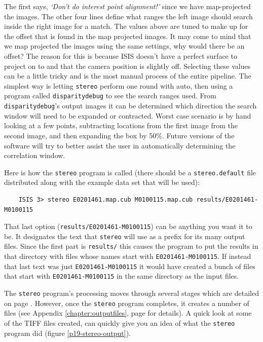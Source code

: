 The first says, \emph{`Don't do interest point alignment!'} since
we have map-projected the images. The other four lines define what
ranges the left image should search inside the right image for a
match. The values above are tuned to make up for the offset that
is found in the map projected images. It may come to mind that we
map projected the images using the same settings, why would there
be an offset? The reason for this is because \ac{ISIS} doesn't have
a perfect surface to project on to and that the camera position is
slightly off. Selecting these values can be a little tricky and is
the most manual process of the entire pipeline. The simplest way
is letting \texttt{stereo} perform one round with auto, then using
a program called \texttt{disparitydebug} to see the search ranges
used. From \texttt{disparitydebug}'s output images it can be
determined which direction the search window will need to be expanded
or contracted. Worst case scenario is by hand looking at a few
points, subtracting locations from the first image from the second
image, and then expanding the box by 50\%. Future versions of the
software will try to better assist the user in automatically
determining the correlation window.

\pagebreak

Here is how the \texttt{stereo} program is called (there should be a
\texttt{stereo.default} file distributed along with the example data
set that will be used):

\begin{verbatim}
    ISIS 3> stereo E0201461.map.cub M0100115.map.cub results/E0201461-M0100115
\end{verbatim}

\noindent
That last option (\texttt{results/E0201461-M0100115}) can be anything you
want it to be.  It designates the text that \texttt{stereo} will use
as a prefix for its many output files.  Since the first part is
\texttt{results/} this causes the program to put the results in that
directory with files whose names start with
\texttt{E0201461-M0100115}. If instead that last text was just
\texttt{E0201461-M0100115} it would have created a bunch of files that
start with \texttt{E0201461-M0100115} in the same directory as the
input files.

The \texttt{stereo} program's processing moves through several
stages which are detailed on page \pageref{entrypoints}.  However,
once the \texttt{stereo} program completes, it creates a number of
files (see Appendix \ref{chapter:outputfiles}, page
\pageref{chapter:outputfiles} for details).  A quick look at some
of the TIFF files created, can quickly give you an idea of what the
\texttt{stereo} program did (figure \ref{p19-stereo-output}).

